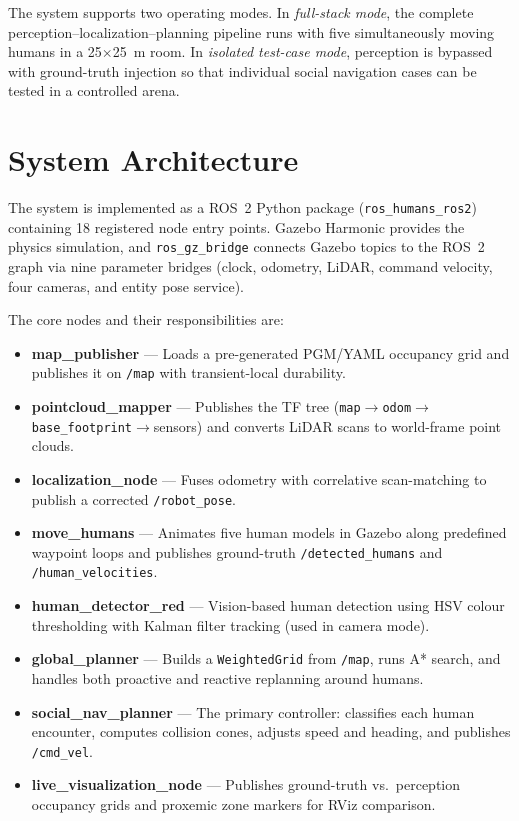 \documentclass[a4paper]{article}
\begin{document}
The system supports two operating modes. In \textit{full-stack mode}, the complete perception--localization--planning pipeline runs with five simultaneously moving humans in a 25$\times$25~m room. In \textit{isolated test-case mode}, perception is bypassed with ground-truth injection so that individual social navigation cases can be tested in a controlled arena.


\section{System Architecture}

The system is implemented as a ROS~2 Python package (\texttt{ros\_humans\_ros2}) containing 18 registered node entry points. Gazebo Harmonic provides the physics simulation, and \texttt{ros\_gz\_bridge} connects Gazebo topics to the ROS~2 graph via nine parameter bridges (clock, odometry, LiDAR, command velocity, four cameras, and entity pose service).

The core nodes and their responsibilities are:

\begin{itemize}
    \item \textbf{map\_publisher} --- Loads a pre-generated PGM/YAML occupancy grid and publishes it on \texttt{/map} with transient-local durability.
    \item \textbf{pointcloud\_mapper} --- Publishes the TF tree (\texttt{map}$\to$\texttt{odom}$\to$\texttt{base\_footprint}$\to$sensors) and converts LiDAR scans to world-frame point clouds.
    \item \textbf{localization\_node} --- Fuses odometry with correlative scan-matching to publish a corrected \texttt{/robot\_pose}.
    \item \textbf{move\_humans} --- Animates five human models in Gazebo along predefined waypoint loops and publishes ground-truth \texttt{/detected\_humans} and \texttt{/human\_velocities}.
    \item \textbf{human\_detector\_red} --- Vision-based human detection using HSV colour thresholding with Kalman filter tracking (used in camera mode).
    \item \textbf{global\_planner} --- Builds a \texttt{WeightedGrid} from \texttt{/map}, runs A* search, and handles both proactive and reactive replanning around humans.
    \item \textbf{social\_nav\_planner} --- The primary controller: classifies each human encounter, computes collision cones, adjusts speed and heading, and publishes \texttt{/cmd\_vel}.
    \item \textbf{live\_visualization\_node} --- Publishes ground-truth vs.\ perception occupancy grids and proxemic zone markers for RViz comparison.
\end{itemize}
\end{document}
